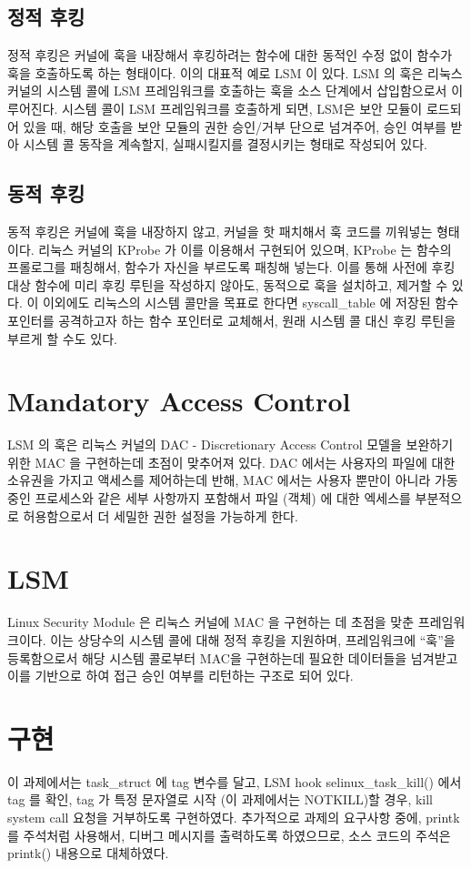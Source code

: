 \documentclass {article}
\begin{document}
\subsection {정적 후킹}
정적 후킹은 커널에 훅을 내장해서 후킹하려는 함수에 대한 동적인 수정 없이 함수가 훅을 호출하도록 하는 형태이다. 이의 대표적 예로 LSM 이 있다. LSM 의 훅은 리눅스 커널의 시스템 콜에 LSM 프레임워크를 호출하는 훅을 소스 단계에서 삽입함으로서 이루어진다. 시스템 콜이 LSM 프레임워크를 호출하게 되면, LSM은 보안 모듈이 로드되어 있을 때, 해당 호출을 보안 모듈의 권한 승인/거부 단으로 넘겨주어, 승인 여부를 받아 시스템 콜 동작을 계속할지, 실패시킬지를 결정시키는 형태로 작성되어 있다.

\subsection {동적 후킹}
동적 후킹은 커널에 훅을 내장하지 않고, 커널을 핫 패치해서 훅 코드를 끼워넣는 형태이다. 리눅스 커널의 KProbe 가 이를 이용해서 구현되어 있으며, KProbe 는 함수의 프롤로그를 패칭해서, 함수가 자신을 부르도록 패칭해 넣는다. 이를 통해 사전에 후킹 대상 함수에 미리 후킹 루틴을 작성하지 않아도, 동적으로 훅을 설치하고, 제거할 수 있다.
이 이외에도 리눅스의 시스템 콜만을 목표로 한다면 syscall\_table 에 저장된 함수 포인터를 공격하고자 하는 함수 포인터로 교체해서, 원래 시스템 콜 대신 후킹 루틴을 부르게 할 수도 있다.

\section {Mandatory Access Control}
LSM 의 훅은 리눅스 커널의 DAC - Discretionary Access Control 모델을 보완하기 위한 MAC 을 구현하는데 초점이 맞추어져 있다. DAC 에서는 사용자의 파일에 대한 소유권을 가지고 액세스를 제어하는데 반해, MAC 에서는 사용자 뿐만이 아니라 가동중인 프로세스와 같은 세부 사항까지 포함해서 파일 (객체) 에 대한 엑세스를 부분적으로 허용함으로서 더 세밀한 권한 설정을 가능하게 한다.

\section {LSM}
Linux Security Module 은 리눅스 커널에 MAC 을 구현하는 데 초점을 맞춘 프레임워크이다. 이는 상당수의 시스템 콜에 대해 정적 후킹을 지원하며, 프레임워크에 ``훅''을 등록함으로서 해당 시스템 콜로부터 MAC을 구현하는데 필요한 데이터들을 넘겨받고 이를 기반으로 하여 접근 승인 여부를 리턴하는 구조로 되어 있다.

\section {구현}
이 과제에서는 task\_struct 에 tag 변수를 달고, LSM hook selinux\_task\_kill() 에서 tag 를 확인, tag 가 특정 문자열로 시작 (이 과제에서는 NOTKILL)할 경우, kill system call 요청을 거부하도록 구현하였다. 추가적으로 과제의 요구사항 중에, printk 를 주석처럼 사용해서, 디버그 메시지를 출력하도록 하였으므로, 소스 코드의 주석은 printk() 내용으로 대체하였다.
\end{document}
